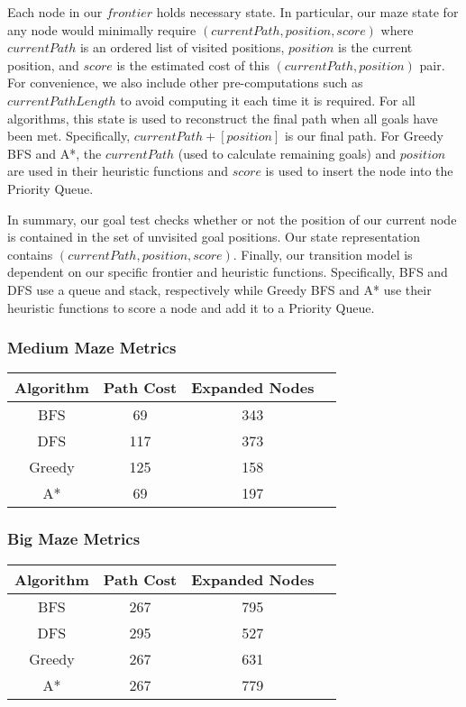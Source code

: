 \documentclass{article}
\begin{document}
Each node in our $frontier$ holds necessary state. In particular, our maze state for any node would minimally require $(currentPath, position, score)$ where $currentPath$ is an ordered list of visited positions, $position$ is the current position, and $score$ is the estimated cost of this $(currentPath, position)$ pair. For convenience, we also include other pre-computations such as $currentPathLength$ to avoid computing it each time it is required. For all algorithms, this state is used to reconstruct the final path when all goals have been met. Specifically, $currentPath + [position]$ is our final path. For Greedy BFS and A*, the $currentPath$ (used to calculate remaining goals) and $position$ are used in their heuristic functions and $score$ is used to insert the node into the Priority Queue.

In summary, our goal test checks whether or not the position of our current node is contained in the set of unvisited goal positions. Our state representation contains $(currentPath, position, score)$. Finally, our transition model is dependent on our specific frontier and heuristic functions. Specifically, BFS and DFS use a queue and stack, respectively while Greedy BFS and A* use their heuristic functions to score a node and add it to a Priority Queue.

\subsubsection{Medium Maze Metrics}

\begin{center}
\begin{tabular}{|c|c|c|c|}
\hline\textbf{Algorithm} & \textbf{Path Cost} & \textbf{Expanded Nodes} \\
\hline\hline BFS & 69 & 343 \\
\hline DFS & 117 & 373 \\
\hline Greedy & 125 & 158 \\
\hline A* & 69 & 197 \\
\hline
\end{tabular}
\end{center}

\subsubsection{Big Maze Metrics}

\begin{center}
\begin{tabular}{|c|c|c|c|}
\hline\textbf{Algorithm} & \textbf{Path Cost} & \textbf{Expanded Nodes} \\
\hline\hline BFS & 267 & 795 \\
\hline DFS & 295 & 527 \\
\hline Greedy & 267 & 631 \\
\hline A* & 267 & 779 \\
\hline
\end{tabular}
\end{center}
\end{document}

